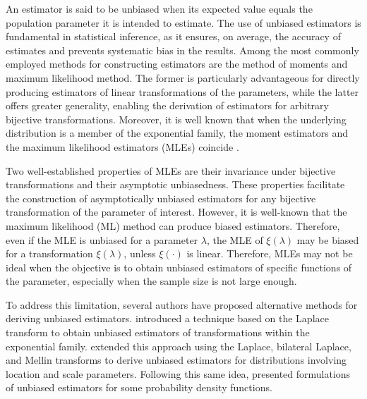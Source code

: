 \documentclass[12pt]{article}
\theoremstyle{definition}
\begin{document}

An estimator is said to be unbiased when its expected value equals the population parameter it is intended to estimate. The use of unbiased estimators is fundamental in statistical inference, as it ensures, on average, the accuracy of estimates and prevents systematic bias in the results. Among the most commonly employed methods for constructing estimators are the method of moments and maximum likelihood method. The former is particularly advantageous for directly producing estimators of linear transformations of the parameters, while the latter offers greater generality, enabling the derivation of estimators for arbitrary bijective transformations. Moreover, it is well known that when the underlying distribution is a member of the exponential family, the moment estimators and the maximum likelihood estimators (MLEs) coincide \citep{Davidson1974}.

Two well-established properties of MLEs are their invariance under bijective transformations and their asymptotic unbiasedness. These properties facilitate the construction of asymptotically unbiased estimators for any bijective transformation of the parameter of interest. However, it is well-known that the maximum likelihood (ML) method can produce biased estimators. Therefore, even if the MLE is unbiased for a parameter $\lambda$, the MLE of $\xi(\lambda)$ may be biased for a transformation $\xi(\lambda)$, unless $\xi(\cdot)$ is linear. Therefore, MLEs may not be ideal when the objective is to obtain unbiased estimators of specific functions of the parameter, especially when the sample size is not large enough.

To address this limitation, several authors have proposed alternative methods for deriving unbiased estimators. \cite{Washio1956} introduced a technique based on the Laplace transform to obtain unbiased estimators of transformations within the exponential family. \cite{Tate1959} extended this approach using the Laplace, bilateral Laplace, and Mellin transforms to derive unbiased estimators for distributions involving location and scale parameters. Following this same idea, \cite{Seheult1971} presented formulations of unbiased estimators for some probability density functions.
\end{document}
